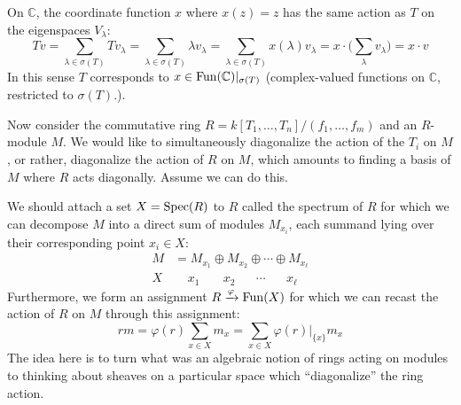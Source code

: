 \documentclass[../../rtnotes.tex]{subfiles}
\begin{document}
On $\mathbb C$, the coordinate function $x$ where $x(z) = z$ has the same action as $T$ on the eigenspaces $V_\lambda$:
\[Tv = \sum_{\lambda\in\sigma(T)}Tv_\lambda = \sum_{\lambda\in\sigma(T)}\lambda v_\lambda = \sum_{\lambda\in\sigma(T)}x(\lambda) v_\lambda = x\cdot \biggl(\sum_\lambda v_\lambda\biggr) = x\cdot v\] 
In this sense $T$ corresponds to $x\in \operatorname{Fun}(\mathbb C)|_{\sigma(T)}$ (complex-valued functions on $\mathbb C$, restricted to $\sigma(T)$.).

Now consider the commutative ring $R = k[T_1,\dots,T_n]/(f_1,\dots,f_m)$ and an $R$-module $M$. We would like to simultaneously diagonalize the action of the $T_i$ on $M$, or rather, diagonalize the action of $R$ on $M$, which amounts to finding a basis of $M$ where $R$ acts diagonally. Assume we can do this. 

We should attach a set $X = \operatorname{Spec}(R)$ to $R$ called the spectrum of $R$ for which we can decompose $M$ into a direct sum of modules $M_{x_i}$, each summand lying over their corresponding point $x_i\in X$:
\begin{align*}
  M &= M_{x_1} \oplus M_{x_2} \oplus \cdots \oplus M_{x_\ell}\\
  X&~~~~~x_1~\phantom{\oplus}~~x_2~~\phantom{\oplus} \cdots \phantom{\oplus}~~x_\ell
\end{align*}
Furthermore, we form an assignment $R\xrightarrow{\varphi} \operatorname{Fun}(X)$ for which we can recast the action of $R$ on $M$ through this assignment:
\[rm = \varphi(r)\sum_{x\in X}m_x = \sum_{x\in X}\varphi(r)|_{\{x\}}m_x\]
The idea here is to turn what was an algebraic notion of rings acting on modules to thinking about sheaves on a particular space which ``diagonalize'' the ring action.
\end{document}
